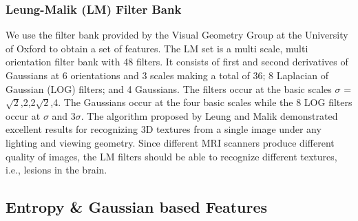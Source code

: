 \documentclass{article} %
\begin{document}
\subsubsection{Leung-Malik (LM) Filter Bank}
We use the filter bank provided by the Visual Geometry Group at the University of Oxford to obtain a set of features. The LM set is a multi scale, multi orientation filter bank with 48 filters. It consists of first and second derivatives of Gaussians at 6 orientations and 3 scales making a total of 36; 8 Laplacian of Gaussian (LOG) filters; and 4 Gaussians. The filters occur at the basic scales $\sigma$ = {$\sqrt{2}$,2,2$\sqrt{2}$,4}. The Gaussians occur at the four basic scales while the 8 LOG filters occur at $\sigma$ and 3$\sigma$. The algorithm proposed by Leung and Malik \cite{LMfilters} demonstrated excellent
results for recognizing 3D textures from a single image under any lighting and viewing geometry. Since different MRI scanners produce different quality of images, the LM filters should be able to recognize different textures, i.e., lesions in the brain.

\subsection{Entropy \& Gaussian based Features}
\end{document}
